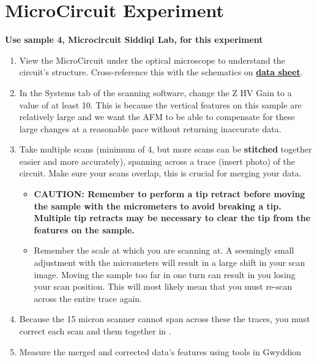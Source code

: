 \documentclass{../lab}
\begin{document}
\section{MicroCircuit Experiment}

\textbf{Use sample 4, Microcircuit Siddiqi Lab, for this experiment}

\begin{enumerate}
    \item View the MicroCircuit under the optical microscope to understand the circuit's structure. Cross-reference this with the schematics on \href{http://experimentationlab.berkeley.edu/sites/default/files/AFMImages/CSQ\_Resonators\_1July2011\%20.pdf}{\textbf{data sheet}}.

    \item In the Systems tab of the scanning software, change the Z HV Gain to a value of at least 10.  This is because the vertical features on this sample are relatively large and we want the AFM to be able to compensate for these large changes at a reasonable pace without returning inaccurate data.

    \item Take multiple scans (minimum of 4, but more scans can be \textbf{stitched} together easier and more accurately), spanning across a trace (insert photo) of the circuit.  Make sure your scans overlap, this is crucial for merging your data.

    \begin{itemize}
        \item \textbf{CAUTION: Remember to perform a tip retract before moving the sample with the micrometers to avoid breaking a tip. Multiple tip retracts may be necessary to clear the tip from the features on the sample.}

        \item ​Remember the scale at which you are scanning at. A seemingly small adjustment with the micrometers will result in a large shift in your scan image. Moving the sample too far in one turn can result in you losing your scan position.  This will most likely mean that you must re-scan across the entire trace again.

    \end{itemize}

    \item Because the 15 micron scanner cannot span across these the traces, you must correct each scan and \textbf{} them together in\textbf{ }.

    \item Measure the merged and corrected data's features using tools in Gwyddion


\end{enumerate}
\end{document}

